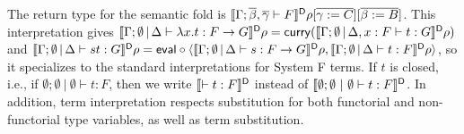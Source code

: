 \documentclass[runningheads]{llncs}
\begin{document}
The return type for the semantic fold is
  $\llbracket{\Gamma;\overline{\beta},\overline{\gamma} \vdash F}\rrbracket^{\mathsf D}\rho[\overline{\gamma :=
    C}][\overline{\beta := B}]$.
  This interpretation gives $\llbracket{\Gamma;\emptyset \,|\, \Delta
    \vdash \lambda x.t : F \to G}\rrbracket^{\mathsf D}\rho = \mathsf{curry}
  (\llbracket{\Gamma;\emptyset \,|\, \Delta, x : F \vdash t :
    G}\rrbracket^{\mathsf D}\rho)$ and $\llbracket{\Gamma;\emptyset \,|\, \Delta \vdash st:
    G}\rrbracket^{\mathsf D} \rho = \mathsf{eval} \circ \langle \llbracket{\Gamma;\emptyset \,|\,
    \Delta \vdash s: F \to G}\rrbracket^{\mathsf D}\rho, \llbracket{\Gamma;\emptyset
    \,|\, \Delta \vdash t: F}\rrbracket^{\mathsf D}\rho \rangle$, so it specializes to
  the standard interpretations for System F terms.  If $t$ is closed,
  i.e., if $\emptyset; \emptyset~|~\emptyset \vdash t : F$, then we
  write $\llbracket{\vdash t : F}\rrbracket^{\mathsf D}$ instead of $\llbracket{\emptyset;
    \emptyset~|~\emptyset \vdash t : F}\rrbracket^{\mathsf D}$.
  In addition, term interpretation respects substitution for both
  functorial and non-functorial type variables, as well as term
  substitution. 
\begin{comment}{
  if 
  $\Gamma,\alpha;\Phi \,|\, \Delta \vdash t : F$ and
  $\Gamma;\Phi,\alpha \,|\, \Delta \vdash t' : F$ and $\Gamma;\Phi
  \vdash G$ then
  $\setsem{\Gamma;\Phi \,|\, \Delta[\alpha := G] \vdash
  t[\alpha := G] : F[\alpha := G]}\rho =
  \setsem{\Gamma,\alpha;\Phi \,|\, \Delta \vdash t : F }\rho [
    \alpha := \setsem{\Gamma;\Phi\vdash G}\rho ]$
and $\setsem{\Gamma;\Phi \,|\, \Delta[\alpha := G] \vdash
  t'[\alpha := G] : F[\alpha := G]}\rho =
  \setsem{\Gamma;\Phi,\alpha \,|\, \Delta \vdash t' : F }\rho [
    \alpha := \setsem{\Gamma;\Phi\vdash G}\rho ]$, 
and if $\Gamma;\Phi \,|\, \Delta, x: G \vdash t : F$ and
$\Gamma;\Phi \,|\, \Delta \vdash s : G$ then
$\lambda A.\, \setsem{\Gamma;\Phi \,|\, \Delta \vdash t[x := s]
  : F }\rho \, A = \lambda A.\,\setsem{\Gamma;\Phi \,|\, \Delta, x:
  G \vdash t : F}\rho \,(A, \setsem{\Gamma;\Phi \,|\,
  \Delta\vdash s: G}\rho\, A)$.
\end{comment}
\end{document}
